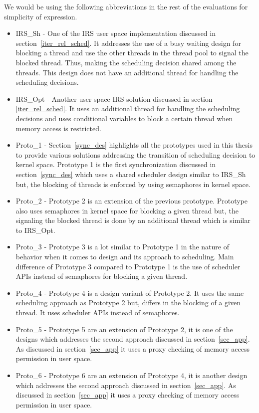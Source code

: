 We would be using the following abbreviations in the rest of the evaluations for simplicity of expression.
\begin{itemize}
\item {IRS\_Sh} - One of the IRS user space implementation discussed in section~\ref{iter_rel_sched}. 
It addresses the use of a busy waiting design for blocking a thread and use the other threads in the thread pool to signal the blocked thread. 
Thus, making the scheduling decision shared among the threads. 
This design does not have an additional thread for handling the scheduling decisions. 
\item {IRS\_Opt} - Another user space IRS solution discussed in section~ \ref{iter_rel_sched}. 
It uses an additional thread for handling the scheduling decisions and uses conditional variables to block a certain thread when memory access is restricted. 
\item {Proto\_1} - Section~\ref{sync_des} highlights all the prototypes used in this thesis to provide various solutions addressing the transition of scheduling decision to kernel space. 
Prototype 1 is the first synchronization discussed in section~\ref{sync_des} which uses a shared scheduler design similar to IRS\_Sh but, the blocking of threads is enforced by using semaphores in kernel space. 
\item {Proto\_2} - Prototype 2 is an extension of the previous prototype. 
Prototype also uses semaphores in kernel space for blocking a given thread but, the signaling the blocked thread is done by an additional thread which is similar to IRS\_Opt.
\item {Proto\_3} - Prototype 3 is a lot similar to Prototype 1 in the nature of behavior when it comes to design and its approach to scheduling. 
Main difference of Prototype 3 compared to Prototype 1 is the use of scheduler APIs instead of semaphores for blocking a given thread. 
\item {Proto\_4} - Prototype 4 is a design variant of Prototype 2. It uses the same scheduling approach as Prototype 2 but, differs in the blocking of a given thread. 
It uses scheduler APIs instead of semaphores. 
\item {Proto\_5} - Prototype 5 are an extension of Prototype 2, it is one of the designs which addresses the second approach discussed in section~\ref{sec_app}. 
As discussed in section~\ref{sec_app} it uses a proxy checking of memory access permission in user space.
\item {Proto\_6} - Prototype 6 are an extension of Prototype 4, it is another design which addresses the second approach discussed in section~\ref{sec_app}. 
As discussed in section~\ref{sec_app} it uses a proxy checking of memory access permission in user space.

\end{itemize}

